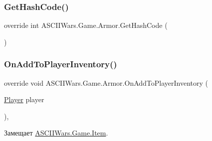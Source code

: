 \hypertarget{class_a_s_c_i_i_wars_1_1_game_1_1_armor_a7abccb710e5f53baf59b4184140d907e}{}\label{class_a_s_c_i_i_wars_1_1_game_1_1_armor_a7abccb710e5f53baf59b4184140d907e} 
\subsubsection{\texorpdfstring{Get\+Hash\+Code()}{GetHashCode()}}
{\footnotesize\ttfamily override int A\+S\+C\+I\+I\+Wars.\+Game.\+Armor.\+Get\+Hash\+Code (\begin{DoxyParamCaption}{ }\end{DoxyParamCaption})\hspace{0.3cm}{\ttfamily [inline]}}

\hypertarget{class_a_s_c_i_i_wars_1_1_game_1_1_armor_ab8e1364e91ddd19f7c214f051b054cd8}{}\label{class_a_s_c_i_i_wars_1_1_game_1_1_armor_ab8e1364e91ddd19f7c214f051b054cd8} 
\subsubsection{\texorpdfstring{On\+Add\+To\+Player\+Inventory()}{OnAddToPlayerInventory()}}
{\footnotesize\ttfamily override void A\+S\+C\+I\+I\+Wars.\+Game.\+Armor.\+On\+Add\+To\+Player\+Inventory (\begin{DoxyParamCaption}\item[{\hyperlink{class_a_s_c_i_i_wars_1_1_game_1_1_player}{Player}}]{player }\end{DoxyParamCaption})\hspace{0.3cm}{\ttfamily [inline]}, {\ttfamily [virtual]}}



Замещает \hyperlink{class_a_s_c_i_i_wars_1_1_game_1_1_item_aec0355b7a9f647ef24897b95563f70d1}{A\+S\+C\+I\+I\+Wars.\+Game.\+Item}.

\hypertarget{class_a_s_c_i_i_wars_1_1_game_1_1_armor_af502379d334f2fc7901638f8a8eba130}{}\label{class_a_s_c_i_i_wars_1_1_game_1_1_armor_af502379d334f2fc7901638f8a8eba130} 
